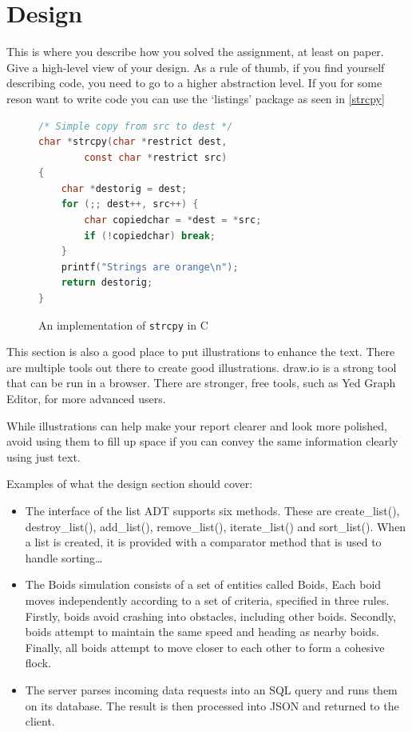 \documentclass[conference]{IEEEtran}
\begin{document}
\section{Design}
\label{Section:Design}
This is where you describe how you solved the assignment, at least on paper. Give a high-level view of your design.
As a rule of thumb, if you find yourself describing code, you need to go to a higher abstraction level. If you for some reson want to write code you can use the `listings' package as seen in \autoref{strcpy}

\begin{figure}[h]
	\begin{lstlisting}[language=C, style=cStyle]
/* Simple copy from src to dest */
char *strcpy(char *restrict dest,
		const char *restrict src)
{
    char *destorig = dest;
    for (;; dest++, src++) {
		char copiedchar = *dest = *src;
		if (!copiedchar) break;
    }
	printf("Strings are orange\n");
    return destorig;
}
\end{lstlisting}
	\caption{An implementation of \lstinline{strcpy} in C}
	\label{strcpy}
\end{figure}

This section is also a good place to put illustrations to enhance the text.
There are multiple tools out there to create good illustrations.
draw.io is a strong tool that can be run in a browser. There are stronger, free tools, such as Yed Graph Editor, for more advanced users.

While illustrations can help make your report clearer and look more polished, avoid using them to fill up space if you can convey the same information clearly using just text.

Examples of what the design section should cover:

\begin{itemize}
	\item The interface of the list ADT supports six methods. These are create\_list(), destroy\_list(), add\_list(), remove\_list(), iterate\_list() and sort\_list(). When a list is created, it is provided with a comparator method that is used to handle sorting{\dots}
	\item The Boids simulation consists of a set of entities called Boids, Each boid moves independently according to a set of criteria, specified in three rules. Firstly, boids avoid crashing into obstacles, including other boids. Secondly, boids attempt to maintain the same speed and heading as nearby boids. Finally, all boids attempt to move closer to each other to form a cohesive flock.
	\item The server parses incoming data requests into an SQL query and runs them on its database. The result is then processed into JSON and returned to the client.
\end{itemize}
\end{document}
